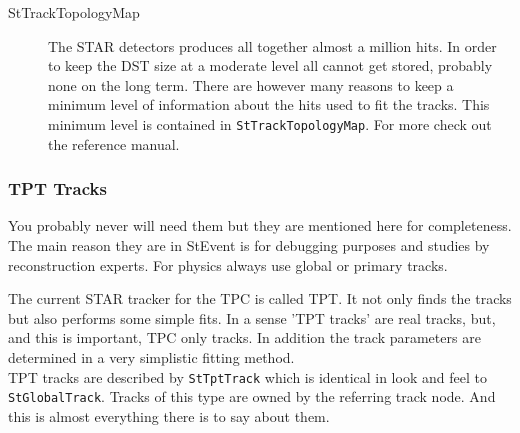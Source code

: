 \documentclass[twoside]{article}
\begin{document}
\begin{description}
\item[StTrackTopologyMap]  The STAR
    detectors produces all together almost a million hits. In order to
    keep the DST size at a moderate level all cannot get stored,
    probably none on the long term. There are however many reasons to
    keep a minimum level of information about the hits used to fit the
    tracks. This minimum level is contained in
    \texttt{StTrackTopologyMap}. For more check out the reference
    manual.
    
\end{description}

\subsubsection{TPT Tracks}
\label{sec:tptTracks} 
You probably never will need them but they are mentioned here for completeness.
The main reason they are in StEvent is for debugging purposes and studies by reconstruction
experts. For physics always use global or primary tracks. 

The current STAR tracker for the TPC is called TPT. It not only finds the tracks
but also performs some simple fits. In a sense 'TPT tracks' are real tracks, but,
and this is important, TPC only tracks. In addition the track parameters are determined
in a very simplistic fitting method. \\
TPT tracks are described by \texttt{StTptTrack} which is identical in look and feel to
\texttt{StGlobalTrack}. Tracks of this type are owned by the referring track node.
And this is almost everything there is to say about them.
\end{document}
